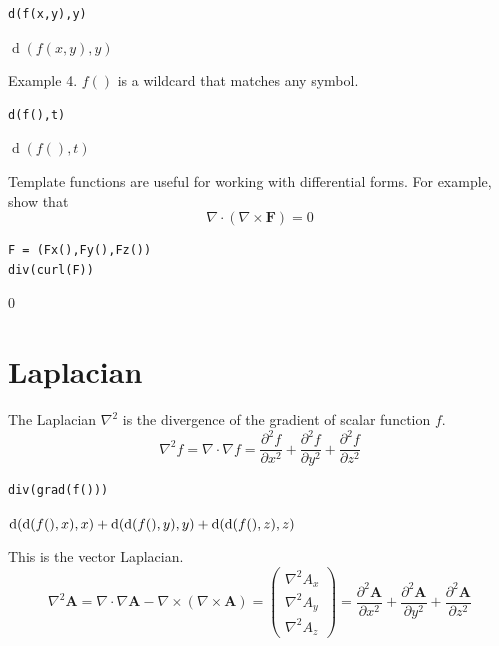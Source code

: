 \documentclass[12pt]{article}
\begin{document}
{\color{blue}
\begin{verbatim}
d(f(x,y),y)
\end{verbatim}}

$\operatorname{d}(f(x,y),y)$

\bigskip
Example 4. $f()$ is a wildcard that matches any symbol.

{\color{blue}
\begin{verbatim}
d(f(),t)
\end{verbatim}}

$\operatorname{d}(f(),t)$

\bigskip
Template functions are useful for working with differential forms.
For example, show that
\begin{equation*}
\nabla\cdot(\nabla\times\mathbf F)=0
\end{equation*}

{\color{blue}
\begin{verbatim}
F = (Fx(),Fy(),Fz())
div(curl(F))
\end{verbatim}}

$0$

\newpage

\section{Laplacian}

The Laplacian $\nabla^2$ is the divergence of the gradient of scalar function $f$.
\begin{equation*}
\nabla^2f=\nabla\cdot\nabla f
=\frac{\partial^2 f}{\partial x^2}
+\frac{\partial^2 f}{\partial y^2}
+\frac{\partial^2 f}{\partial z^2}
\end{equation*}

{\color{blue}
\begin{verbatim}
div(grad(f()))
\end{verbatim}}

$\displaystyle
\operatorname{\rm d}(\operatorname{\rm d}(f(),x),x)
+\operatorname{\rm d}(\operatorname{\rm d}(f(),y),y)
+\operatorname{\rm d}(\operatorname{\rm d}(f(),z),z)
$

\bigskip
This is the vector Laplacian.
\begin{equation*}
\nabla^2\mathbf A
=\nabla\cdot\nabla\mathbf A-\nabla\times(\nabla\times\mathbf A)
=\begin{pmatrix}
\nabla^2A_x
\\
\nabla^2A_y
\\
\nabla^2A_z
\end{pmatrix}
=\frac{\partial^2\mathbf A}{\partial x^2}
+\frac{\partial^2\mathbf A}{\partial y^2}
+\frac{\partial^2\mathbf A}{\partial z^2}
\end{equation*}
\end{document}

